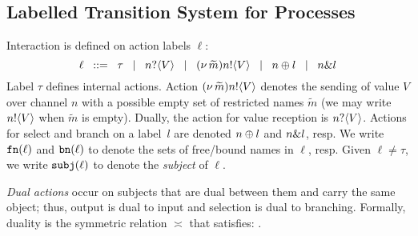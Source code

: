 \documentclass[a4paper,UKenglish]{lipics}
\theoremstyle{definition}
\begin{document}
\subsection{Labelled Transition System for Processes}\label{ss:lts}

Interaction is defined on action labels $\ell$:
	$$\ell	\;\;::=\;\;   \tau 
		\;\;\;|\;\;\;	n ? \langle V \rangle 
		\;\;\;|\;\;\;	(\nu\, \widetilde{m}) n ! \langle V \rangle
		\;\;\;|\;\;\;	n \oplus l 
		\;\;\;|\;\;\;	n \& l $$
\noi 
Label $\tau$ defines internal actions.
Action $(\nu\, \widetilde{m}) n ! \langle V \rangle$ denotes the sending of value $V$
over channel $n$ with
a possible empty set of restricted names $\widetilde{m}$ 
(we may write $n ! \langle V \rangle$ when $\widetilde{m}$ is empty).
Dually, the action for value reception is 
$n ? \langle V \rangle$.
Actions for select
and branch on
a label~$l$ are denoted $n \oplus l$ and $n \& l$, resp.
We write $\mathtt{fn}(\ell)$ and $\mathtt{bn}(\ell)$ to denote the
 sets of free/bound names in $\ell$, resp.
Given $\ell \neq \tau$, we write 
$\mathtt{subj}(\ell)$
to denote the \emph{subject} of $\ell$.


\emph{Dual actions} %
occur on subjects that are dual between them and carry the same
object; thus, output is dual to input and 
selection is dual to branching.
Formally, duality 
is the symmetric relation $\asymp$ that satisfies:
.
%
%
\end{document}
